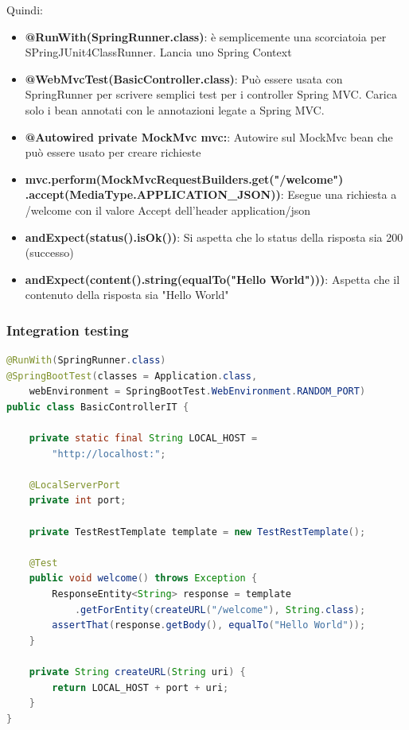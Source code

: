\documentclass[11pt,a4paper]{book}
\begin{document}
Quindi:
\begin{itemize}
	\item \textbf{@RunWith(SpringRunner.class)}: è semplicemente una scorciatoia per SPringJUnit4ClassRunner. Lancia uno Spring Context
	\item \textbf{@WebMvcTest(BasicController.class)}: Può essere usata con SpringRunner per scrivere semplici test per i controller Spring MVC. Carica solo i bean annotati con le annotazioni legate a Spring MVC. 
	\item \textbf{@Autowired private MockMvc mvc:}: Autowire sul MockMvc bean che può essere usato per creare richieste
	\item \textbf{mvc.perform(MockMvcRequestBuilders.get("/welcome")\\.accept(MediaType.APPLICATION\_JSON))}: Esegue una richiesta a /welcome con il valore Accept dell'header application/json
	\item \textbf{andExpect(status().isOk())}: Si aspetta che lo status della risposta sia 200 (successo)
	\item \textbf{andExpect(content().string(equalTo("Hello World")))}: Aspetta che il contenuto della risposta sia "Hello World"
\end{itemize}

\subsubsection{Integration testing}
\begin{lstlisting}[language = Java]
@RunWith(SpringRunner.class)
@SpringBootTest(classes = Application.class,
	webEnvironment = SpringBootTest.WebEnvironment.RANDOM_PORT)
public class BasicControllerIT {
	
	private static final String LOCAL_HOST =
		"http://localhost:";

	@LocalServerPort
	private int port;

	private TestRestTemplate template = new TestRestTemplate();

	@Test
	public void welcome() throws Exception {
		ResponseEntity<String> response = template
			.getForEntity(createURL("/welcome"), String.class);
		assertThat(response.getBody(), equalTo("Hello World"));
	}
	
	private String createURL(String uri) {
		return LOCAL_HOST + port + uri;
	}
}
\end{lstlisting}
\end{document}
